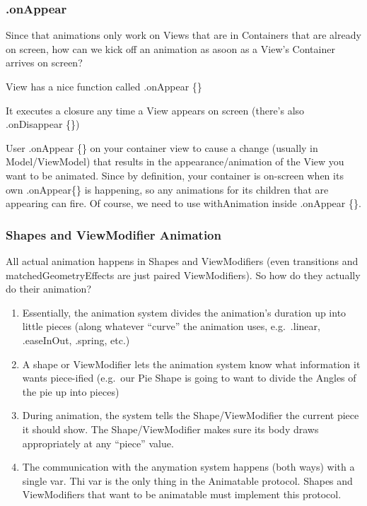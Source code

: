 \documentclass[]{article}
\providecommand{\tightlist}{%
  \setlength{\itemsep}{0pt}\setlength{\parskip}{0pt}}
\begin{document}
\hypertarget{onappear}{%
\subsubsection{.onAppear}\label{onappear}}

Since that animations only work on Views that are in Containers that are
already on screen, how can we kick off an animation as asoon as a View's
Container arrives on screen?

View has a nice function called .onAppear \{\}

It executes a closure any time a View appears on screen (there's also
.onDisappear \{\})

User .onAppear \{\} on your container view to cause a change (usually in
Model/ViewModel) that results in the appearance/animation of the View
you want to be animated. Since by definition, your container is
on-screen when its own .onAppear\{\} is happening, so any animations for
its children that are appearing can fire. Of course, we need to use
withAnimation inside .onAppear \{\}.

\hypertarget{shapes-and-viewmodifier-animation}{%
\subsubsection{Shapes and ViewModifier
Animation}\label{shapes-and-viewmodifier-animation}}

All actual animation happens in Shapes and ViewModifiers (even
transitions and matchedGeometryEffects are just paired ViewModifiers).
So how do they actually do their animation?

\begin{enumerate}
\def\labelenumi{\arabic{enumi}.}
\tightlist
\item
  Essentially, the animation system divides the animation's duration up
  into little pieces (along whatever ``curve'' the animation uses,
  e.g.~.linear, .easeInOut, .spring, etc.)
\item
  A shape or ViewModifier lets the animation system know what
  information it wants piece-ified (e.g.~our Pie Shape is going to want
  to divide the Angles of the pie up into pieces)
\item
  During animation, the system tells the Shape/ViewModifier the current
  piece it should show. The Shape/ViewModifier makes sure its body draws
  appropriately at any ``piece'' value.
\item
  The communication with the anymation system happens (both ways) with a
  single var. Thi var is the only thing in the Animatable protocol.
  Shapes and ViewModifiers that want to be animatable must implement
  this protocol.
\end{enumerate}
\end{document}
